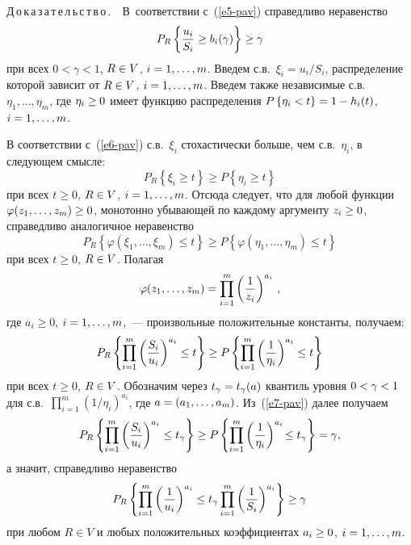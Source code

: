 \begin{multicols}{2}
     \medskip
     
     \noindent
     Д\,о\,к\,а\,з\,а\,т\,е\,л\,ь\,с\,т\,в\,о\,.\ \ В~соответствии с~(\ref{e5-pav}) 
справедливо неравенство
     \begin{equation}
     P_R\left\{ \displaystyle\frac{\displaystyle u_i\mathstrut}{\displaystyle S_i\mathstrut}\geq b_i(\gamma)\right\} \geq \gamma
     \label{e6-pav}
     \end{equation}
при всех $0<\gamma <1$, $R\hm\in V$, $i\hm=1, \ldots ,m$. Введем с.в.\
 $\xi_i = u_i/S_i$, распределение которой зависит от $R\hm\in V$, 
$i\hm= 1,\ldots ,m$. Введем также независимые с.в.\ $\eta_1, \ldots ,\eta_m$, 
где $\eta_i\hm\geq 0$ имеет функцию распределения $P\left\{ \eta_i<t\right\} 
\hm= 1\hm- h_i(t)$, $i\hm= 1,\ldots , m$.
     
     В соответствии с~(\ref{e6-pav}) с.в.~$\xi_i$ стохастически больше, чем 
с.в.~$\eta_i$, в следующем смысле:
     $$
     P_R\left\{ \xi_i\geq t\right\} \geq P\left\{ \eta_i\geq t\right\}
     $$
при всех $t\geq 0$, $R\hm\in V$, $i\hm=1,\ldots , m$. Отсюда следует, что для 
любой функции $\varphi(z_1, \ldots , z_m)\hm \geq 0$, монотонно убывающей 
по каждому аргументу $z_i\hm\geq 0$, справедливо аналогичное неравенство 
$$
P_R\left\{ \varphi(\xi_1, \ldots ,\xi_m)\leq t\right\} \geq P\left\{ \varphi(\eta_1, 
\ldots ,\eta_m)\leq t\right\}
$$
при всех $t\geq 0$, $R\hm\in V$. Полагая 
$$
\varphi(z_1, \ldots ,z_m) =\prod\limits_{i=1}^m \left( \displaystyle\frac{\displaystyle 1\mathstrut}{\displaystyle z_i\mathstrut}\right)^{a_i}\,,
$$
где $a_i\geq 0$, $i\hm=1,\ldots , m$,~--- произвольные положительные 
константы, получаем: 
\begin{equation}
P_R\left\{ \prod\limits_{i=1}^m \left( \displaystyle\frac{\displaystyle S_i\mathstrut}{\displaystyle u_i\mathstrut} \right)^{a_i} \leq t\right\} 
\geq P\left\{ \prod\limits_{i=1}^m \left( \displaystyle\frac{\displaystyle 1\mathstrut}{\displaystyle \eta_i\mathstrut}\right)^{a_i}\leq t\right\}
\label{e7-pav}
\end{equation}
при всех $t\geq 0$, $R\hm\in V$. Обозначим через $t_\gamma\hm= 
t_\gamma(a)$ квантиль уровня $0\hm<\gamma\hm<1$  для с.в.\ 
$\prod\limits_{i=1}^m (1/\eta_i)^{a_i}$,  где $a\hm= (a_1, \ldots , a_m)$. 
Из~(\ref{e7-pav}) далее получаем 
$$
P_R \left\{ \prod\limits_{i=1}^m \left( \displaystyle\frac{\displaystyle S_i\mathstrut}{\displaystyle u_i\mathstrut}\right)^{a_i} \leq 
t_\gamma\right\} \geq P\left\{ \prod\limits_{i=1}^m \left( 
\displaystyle\frac{\displaystyle 1\mathstrut}{\displaystyle \eta_i\mathstrut}\right)^{a_i}\!\leq t_\gamma \right\} =\gamma,
$$
а значит, справедливо неравенство
\begin{equation}
P_R\left\{ \prod\limits_{i=1}^m \left( \displaystyle\frac{\displaystyle 1\mathstrut}{\displaystyle u_i\mathstrut}\right)^{a_i} \leq t_\gamma 
\prod\limits_{i=1}^m \left( \displaystyle\frac{\displaystyle 1\mathstrut}{\displaystyle S_i\mathstrut}\right)^{a_i}\right\} \geq \gamma
\label{e8-pav}
\end{equation}
при любом $R\in V$ и любых положительных коэффициентах $a_i\hm\geq 0$, 
$i\hm=1, \ldots , m$.
     

\end{multicols}
